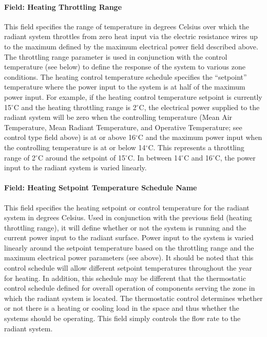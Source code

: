 \paragraph{Field: Heating Throttling Range}\label{field-heating-throttling-range-1}

This field specifies the range of temperature in degrees Celsius over which the radiant system throttles from zero heat input via the electric resistance wires up to the maximum defined by the maximum electrical power field described above. The throttling range parameter is used in conjunction with the control temperature (see below) to define the response of the system to various zone conditions. The heating control temperature schedule specifies the ``setpoint'' temperature where the power input to the system is at half of the maximum power input. For example, if the heating control temperature setpoint is currently 15$^\circ$C and the heating throttling range is 2$^\circ$C, the electrical power supplied to the radiant system will be zero when the controlling temperature (Mean Air Temperature, Mean Radiant Temperature, and Operative Temperature; see control type field above) is at or above 16$^\circ$C and the maximum power input when the controlling temperature is at or below 14$^\circ$C. This represents a throttling range of 2$^\circ$C around the setpoint of 15$^\circ$C. In between 14$^\circ$C and 16$^\circ$C, the power input to the radiant system is varied linearly.

\paragraph{Field: Heating Setpoint Temperature Schedule Name}\label{field-heating-setpoint-temperature-schedule-name-1}

This field specifies the heating setpoint or control temperature for the radiant system in degrees Celsius. Used in conjunction with the previous field (heating throttling range), it will define whether or not the system is running and the current power input to the radiant surface. Power input to the system is varied linearly around the setpoint temperature based on the throttling range and the maximum electrical power parameters (see above). It should be noted that this control schedule will allow different setpoint temperatures throughout the year for heating. In addition, this schedule may be different that the thermostatic control schedule defined for overall operation of components serving the zone in which the radiant system is located. The thermostatic control determines whether or not there is a heating or cooling load in the space and thus whether the systems should be operating. This field simply controls the flow rate to the radiant system.

